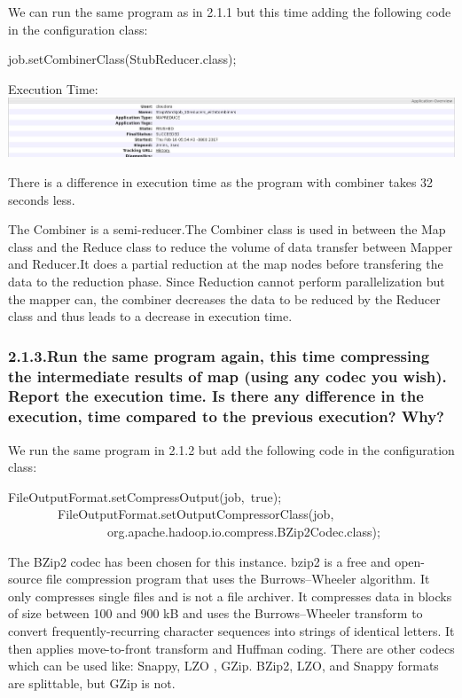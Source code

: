 \documentclass{article}
\begin{document}
\noindent We can run the same program as in 2.1.1 but this time adding the following code in the configuration class:%
\begin{mdpre}%
\noindent job.setCombinerClass(StubReducer.{class});%
\end{mdpre}\noindent Execution Time:
\includegraphics[keepaspectratio=true,width=\dimmin{}{\dimwidth{1.30}}]{images/stopwords3}{}

\noindent There is a difference in execution time as the program with combiner takes 32 seconds less.%

The Combiner is a semi-reducer.The Combiner class is used in between the Map class and 
the Reduce class to reduce the volume of data transfer between Mapper and Reducer.It does a partial reduction at the map nodes before transfering the data to the reduction phase.
Since Reduction cannot perform parallelization but the mapper can, the combiner decreases the data to be reduced by the Reducer class and thus leads to a decrease in execution time.%

\subsubsection{2.1.3.\hspace*{0.5em}Run the same program again, this time compressing the intermediate results of map (using any codec you wish). Report the execution time. Is there any difference in the execution, time compared to the previous execution? Why?}\label{heading}%

\noindent We run the same program in 2.1.2 but add  the following code in the configuration class:%
\begin{mdpre}%
\noindent FileOutputFormat.setCompressOutput(job,~{true});\\
~~~~~~~~FileOutputFormat.setOutputCompressorClass(job,\\
~~~~~~~~~~~~~~~~org.apache.hadoop.io.compress.BZip2Codec.{class});%
\end{mdpre}\noindent The BZip2 codec has been chosen for this instance. bzip2 is a free and open-source file compression program that uses the Burrows–Wheeler algorithm. It only compresses single files and is not a file archiver. 
It compresses data in blocks of size between 100 and 900 kB and uses the Burrows–Wheeler transform to convert frequently-recurring character sequences into strings of identical letters. It then applies move-to-front transform and Huffman coding.
There are other codecs which can be used like: Snappy, LZO , GZip. BZip2, LZO, and Snappy formats are splittable, but GZip is not.
\end{document}
